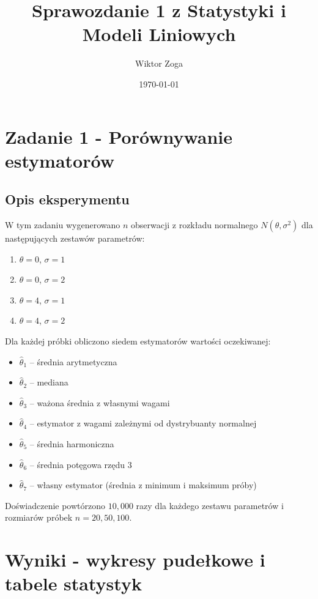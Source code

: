 \documentclass[a4paper,12pt]{article}
\title{Sprawozdanie 1 z Statystyki i Modeli Liniowych}
\author{Wiktor Zoga}
\date{\today}
\begin{document}
\maketitle
\newpage

\section{Zadanie 1 - Porównywanie estymatorów}

\subsection{Opis eksperymentu}
W tym zadaniu wygenerowano $n$ obserwacji z rozkładu normalnego $N(\theta, \sigma^2)$ dla następujących zestawów parametrów:

\begin{enumerate}
    \item $\theta = 0$, $\sigma = 1$
    \item $\theta = 0$, $\sigma = 2$
    \item $\theta = 4$, $\sigma = 1$
    \item $\theta = 4$, $\sigma = 2$
\end{enumerate}

Dla każdej próbki obliczono siedem estymatorów wartości oczekiwanej:

\begin{itemize}
    \item $\hat{\theta}_1$ -- średnia arytmetyczna
    \item $\hat{\theta}_2$ -- mediana
    \item $\hat{\theta}_3$ -- ważona średnia z własnymi wagami
    \item $\hat{\theta}_4$ -- estymator z wagami zależnymi od dystrybuanty normalnej
    \item $\hat{\theta}_5$ -- średnia harmoniczna
    \item $\hat{\theta}_6$ -- średnia potęgowa rzędu 3
    \item $\hat{\theta}_7$ -- własny estymator (średnia z minimum i maksimum próby)
\end{itemize}

Doświadczenie powtórzono $10{,}000$ razy dla każdego zestawu parametrów i rozmiarów próbek $n = 20, 50, 100$.

\newpage

\section{Wyniki - wykresy pudełkowe i tabele statystyk}
\end{document}
